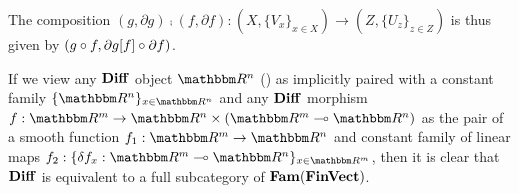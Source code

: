 \noindent The composition $(g, \partial g) \comp (f, \partial f): (X, \{V_x\}_{x \in X}) \to (Z, \{U_z\}_{z
\in Z})$ is thus given by $(g \circ f, \partial g[f] \circ \partial f)$.

If we view any $\mathbf{Diff}$ object $\RR^n$ () as implicitly paired with a constant family
$\{\RR^n\}_{x \in \RR^n}$ and any $\mathbf{Diff}$ morphism $f: \RR^m \to \RR^n \times (\RR^m \linearto \RR^n)$ as the
pair of a smooth function $f_1: \RR^m \to \RR^n$ and constant family of linear maps $f_2: \{\delta f_x: \RR^m
\linearto \RR^n\}_{x \in \RR^m}$, then it is clear that $\mathbf{Diff}$ is equivalent to a full subcategory of
$\mathbf{Fam}(\mathbf{FinVect})$.
